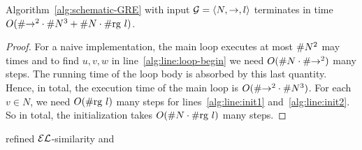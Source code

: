 \iffullversion
\begin{theorem}
Algorithm~\ref{alg:schematic-GRE} with input $\mathcal{G} = \langle N,\to,l\rangle$
terminates in time
$O(\size{{\to}}^2\cdot\size{N}^3+\size{N}\cdot\size{\rg\ l})$.
\end{theorem}
\fi

\iffullversion
\begin{proof}
For a naive implementation, the main loop executes at most
$\# N^2$ may times and to find $u,v,w$ in
line~\ref{alg:line:loop-begin} we need $O(\# N\cdot\# {\to}^2)$
many steps. The running time of the loop body is absorbed by this
last quantity. Hence, in total, the execution time of the main loop
is $O(\# {\to}^2\cdot\# N^3)$. For each $v\in N$, we need
$O(\# {\rm rg}\ l)$ many steps for lines~\ref{alg:line:init1} and~\ref{alg:line:init2}. So in total, the initialization takes
$O(\# N\cdot\# {\rm rg}\ l)$ many steps.
\end{proof}
\else
\fi

\iffullversion
\begin{algorithm} \small
\io


 \caption{\small refined $\mathcal{EL}$-similarity and
\posre}\label{alg:refined-GRE}
\end{algorithm}
\fi

